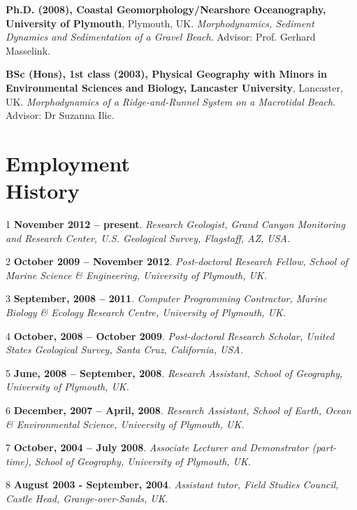 \documentclass[margin,line]{resume}
\begin{document}
\begin{resume}
        \begin{footnotesize}
    {\bf Ph.D. (2008), Coastal Geomorphology/Nearshore Oceanography, University of Plymouth}, Plymouth, UK. {\sl Morphodynamics, Sediment Dynamics and Sedimentation of a Gravel Beach}. Advisor:  Prof. Gerhard Masselink.

    {\bf BSc (Hons), 1st class (2003), Physical Geography with Minors in Environmental Sciences and Biology, Lancaster University}, Lancaster, UK.  {\sl Morphodynamics of a Ridge-and-Runnel System on a Macrotidal Beach}. Advisor:  Dr Suzanna Ilic. 
        \end{footnotesize}

    \section{\mysidestyle Employment\\History}

        \begin{footnotesize}
        \begin{list1}
    \item[1]{\bf November 2012 --  present}. {\sl Research Geologist, Grand Canyon Monitoring and Research Center, U.S. Geological Survey, Flagstaff, AZ, USA.}
    \item[2]{\bf October 2009 -- November 2012}. {\sl Post-doctoral Research Fellow, School of Marine Science \& Engineering, University of Plymouth, UK.} 
    \item[3]{\bf September, 2008 -- 2011}. {\sl Computer Programming Contractor, Marine Biology \& Ecology Research Centre, University of Plymouth, UK.} 
    \item[4]{\bf October, 2008 -- October 2009}. {\sl Post-doctoral Research Scholar, United States Geological Survey, Santa Cruz, California, USA.} 
    \item[5]{\bf June, 2008 -- September, 2008}. {\sl Research Assistant, School of Geography, University of Plymouth, UK.} 
    \item[6]{\bf December, 2007 -- April, 2008}. {\sl Research Assistant, School of Earth, Ocean \& Environmental Science, University of Plymouth, UK.} 
   \item[7] {\bf October, 2004 -- July 2008}. {\sl Associate Lecturer and Demonstrator (part-time), School of Geography, University of Plymouth, UK.}
    \item[8]{\bf August 2003 - September, 2004}. {\sl Assistant tutor, Field Studies Council, Castle Head, Grange-over-Sands, UK}.
    \end{list1}
        \end{footnotesize}


\end{resume}
\end{document}
